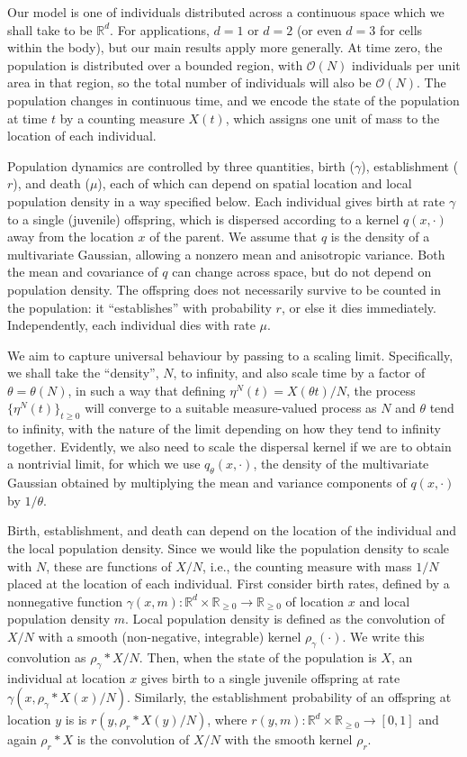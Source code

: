 \documentclass[EJP]{ejpecp} %
\newcommand{\IR}{\mathbb R}
\newcommand{\bigO}{\mathcal{O}}
\newcommand{\kernel}{\rho}  %
\newcommand{\smooth}[1]{\kernel_{#1} \! * \!}  %
\begin{document}
Our model is one of individuals distributed across a continuous space 
which we shall take to be $\IR^d$. 
For applications, $d=1$ or $d=2$
(or even $d=3$ for cells within the body),
but our main results apply more generally.
At time zero, the population is distributed over a bounded region, with 
$\bigO(N)$ individuals per unit area in that region,
so the total number of individuals will also be $\bigO(N)$.
The population changes in continuous time, and
we encode the state of the population at time $t$ by a counting measure $X(t)$,
which assigns one unit of mass to the location of each individual.

Population dynamics are controlled by three quantities,
birth ($\gamma$), establishment ($r$), and death ($\mu$),
each of which can depend on spatial location and local population density
in a way specified below.
Each individual gives birth at rate $\gamma$ to a single (juvenile) offspring,
which is dispersed according to a kernel $q(x, \cdot)$ away from the location $x$ of the parent.
We assume that $q$ is the density of a multivariate Gaussian,
allowing a nonzero mean and anisotropic variance.
Both the mean and covariance of $q$ can change across space,
but do not depend on population density.
The offspring does not necessarily survive to be counted in the population:
it ``establishes'' with probability $r$,
or else it dies immediately.
Independently, each individual dies with rate $\mu$.

We aim to capture universal behaviour by passing to a scaling limit. Specifically, 
we shall take the ``density'', $N$, to infinity,
and also scale time by a factor of $\theta = \theta(N)$,
in such a way that defining $\eta^N(t) = X(\theta t) / N$,
the process $\{\eta^N(t)\}_{t \ge 0}$
will converge to a suitable measure-valued process
as $N$ and $\theta$ tend to infinity,
with the nature of the limit depending on how they tend to infinity together.
Evidently, we also need to scale the dispersal kernel if we are to obtain a
nontrivial limit, for which we use $q_\theta(x,\cdot)$,
the density of the multivariate Gaussian obtained by
multiplying the mean and variance components of $q(x,\cdot)$ by $1/\theta$.

Birth, establishment, and death can depend on the location of the individual
and the local population density.
Since we would like the population density to scale with $N$,
these are functions of $X/N$, i.e.,
the counting measure with mass $1/N$ placed at the location of each individual.
First consider birth rates, defined by
a nonnegative function $\gamma(x, m) : \IR^d \times \IR_{\ge 0} \to \IR_{\ge 0}$
of location $x$ 
and local population density $m$.
Local population density is defined as the convolution of $X/N$ with 
a smooth (non-negative, integrable) kernel $\rho_\gamma(\cdot)$.
We write this convolution as $\smooth{\gamma} X/N$.
Then, when the state of the population is $X$, an individual at location $x$ 
gives birth to a single juvenile offspring at rate
$\gamma(x, \smooth{\gamma} X(x) / N)$.
Similarly, the establishment probability of an offspring at location $y$ is
is $r(y, \smooth{r} X(y) / N)$,
where $r(y, m) : \IR^d \times \IR_{\ge 0} \to [0, 1]$
and again $\smooth{r} X$ is the convolution of 
$X/N$ with the smooth kernel $\rho_r$.
\end{document}
